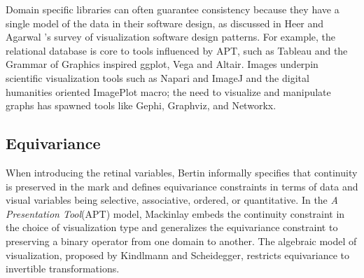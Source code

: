 \documentclass[10pt,journal,compsoc]{IEEEtran}
\theoremstyle{definition}
\theoremstyle{remark}
\begin{document}
Domain specific libraries can often guarantee consistency because they have a single model of the data in their software design, as discussed in Heer and Agarwal \cite{HeerSoftware2006}'s survey of visualization software design patterns. For example, the relational database is core to tools influenced by APT, such as Tableau\cite{StoltePolaris2002,hanrahanVizQL2006,MackinlayShowme2007} and the Grammar of Graphics\cite{wilkinsonGrammarGraphics2005} inspired ggplot\cite{wickhamGgplot2ElegantGraphics2016a}, Vega\cite{satyanarayanDeclarativeInteractionDesign2014} and Altair\cite{vanderplasAltairInteractiveStatistical2018}. Images underpin scientific visualization tools such as Napari\cite{nicholas_sofroniew_2021_4533308} and ImageJ\cite{schneiderNIHImageImageJ2012} and the digital humanities oriented ImagePlot\cite{studiesCulturevisImageplot2021} macro; the need to visualize and manipulate graphs has spawned tools like Gephi\cite{bastianGephiOpenSource2009}, Graphviz\cite{ellsonGraphvizOpenSource2002}, and Networkx\cite{HagbergExploringNetwork2008}. 
 
\subsection{Equivariance}
\label{sec:related-work:equivariance}
When introducing the retinal variables, Bertin informally specifies that continuity is preserved in the mark and defines equivariance constraints in terms of data and visual variables being selective, associative, ordered, or quantitative\cite{bertinSemiologyGraphicsDiagrams2011a}. In the \textit{A Presentation Tool}(APT) model, Mackinlay embeds the continuity constraint in the choice of visualization type and generalizes the equivariance constraint to preserving a binary operator from one domain to another. The algebraic model of visualization\cite{kindlmannAlgebraicProcessVisualization2014}, proposed by Kindlmann and Scheidegger, restricts equivariance to invertible transformations.
\end{document}
